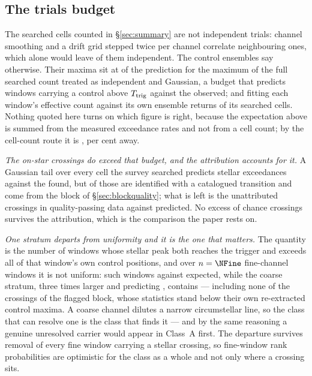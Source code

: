 \subsection{The trials budget}

The searched cells counted in \S\ref{sec:summary} are not independent
trials: channel smoothing and a drift grid stepped twice per channel
correlate neighbouring ones, which alone would leave \StGridFrac{} of them
independent. The control ensembles say otherwise. Their maxima sit at
\CtrlMaxRatioMed{} of the prediction for the maximum of the full searched
count treated as independent and Gaussian, a budget that predicts
\NCtrlWinExp{} windows carrying a control above $T_{\rm trig}$ against the
\NCtrlWinObs{} observed; and fitting each window's effective count against
its own ensemble returns \StNindFrac{} of its searched cells. Nothing quoted
here turns on which figure is right, because the expectation above is summed
from the measured exceedance rates and not from a cell count; by the
cell-count route it is \StExpModel, \StModelAgreePct{} per cent away.

\emph{The on-star crossings do exceed that budget, and the attribution
accounts for it.} A Gaussian tail over every cell the survey searched
predicts \CellExpect{} stellar exceedances against the \NCross{} found, but
\NAttributed{} of those are identified with a catalogued transition and
\EvNCrossFlag{} come from the block of \S\ref{sec:blockquality}; what is left
is the \StObs{} unattributed crossings in quality-passing data against
\StExpSurv{} predicted. No excess of chance crossings survives the
attribution, which is the comparison the paper rests on.

\emph{One stratum departs from uniformity and it is the one that matters.}
The quantity is the number of windows whose stellar peak both reaches the
trigger and exceeds all \NCtrl{} of that window's own control positions, and
over $n=\NFine$ fine-channel windows it is not uniform: \NStageOneFine{}
such windows against \ExpStageOneFine{} expected, while the coarse stratum,
three times larger and predicting \ExpStageOneCoarse, contains
\NStageOneCoarse{} --- including none of the \EvNCrossFlag{} crossings of the
flagged block, whose statistics stand below their own re-extracted control
maxima. A coarse channel dilutes a narrow circumstellar line, so
the class that can resolve one is the class that finds it --- and by the same
reasoning a genuine unresolved carrier would appear in Class~A first. The
departure survives removal of every fine window carrying a stellar crossing,
so fine-window rank probabilities are optimistic for the class as a whole and
not only where a crossing sits.

